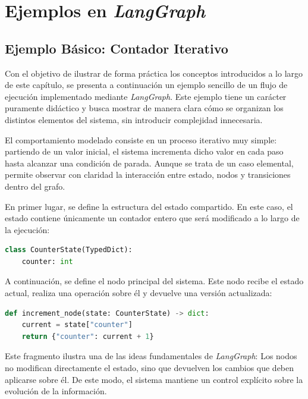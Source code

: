 \documentclass[12pt,a4paper,twoside,openright]{book}
\begin{document}
\section{Ejemplos en \emph{LangGraph}}

\subsection{Ejemplo Básico: Contador Iterativo}

Con el objetivo de ilustrar de forma práctica los conceptos introducidos a lo largo de este capítulo, se presenta a continuación un ejemplo sencillo de un flujo de ejecución implementado mediante \emph{LangGraph}.
Este ejemplo tiene un carácter puramente didáctico y busca mostrar de manera clara cómo se organizan los distintos elementos del sistema, sin introducir complejidad innecesaria.

El comportamiento modelado consiste en un proceso iterativo muy simple: partiendo de un valor inicial, el sistema incrementa dicho valor en cada paso hasta alcanzar una condición de parada. Aunque se trata de un
caso elemental, permite observar con claridad la interacción entre estado, nodos y transiciones dentro del grafo.

En primer lugar, se define la estructura del estado compartido. En este caso, el estado contiene únicamente un contador entero que será modificado a lo largo de la ejecución:

\begin{lstlisting}[language=Python, caption={Estructura del estado del grafo}]
class CounterState(TypedDict):
    counter: int
\end{lstlisting}

A continuación, se define el nodo principal del sistema. Este nodo recibe el estado actual, realiza una operación sobre él y devuelve una versión actualizada:

\begin{lstlisting}[language=Python, caption={Nodo principal del sistema}]
def increment_node(state: CounterState) -> dict:
    current = state["counter"]
    return {"counter": current + 1}
\end{lstlisting}

Este fragmento ilustra una de las ideas fundamentales de \emph{LangGraph}: Los nodos no modifican directamente el estado, sino que devuelven los cambios que deben aplicarse sobre él. De este modo, el sistema mantiene
un control explícito sobre la evolución de la información.
\end{document}
